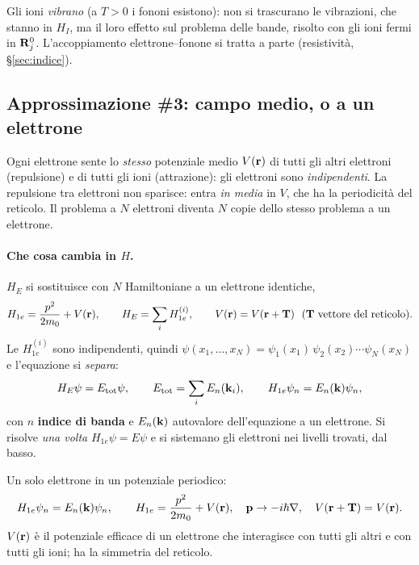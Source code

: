 \documentclass[11pt,a4paper]{article}
\begin{document}
\begin{osservazione}
Gli ioni \emph{vibrano} (a $T>0$ i fononi esistono): non si trascurano le vibrazioni, che stanno in $H_I$, ma il loro effetto sul problema delle bande,
risolto con gli ioni fermi in $\mathbf R_j^0$. L'accoppiamento elettrone--fonone si tratta a parte (resistività, §\ref{sec:indice}).
\end{osservazione}

\subsection{Approssimazione \#3: campo medio, o a un elettrone}\label{sec:approx3}
\begin{approssimazione}
Ogni elettrone sente lo \emph{stesso} potenziale medio $V(\mathbf r)$ di tutti gli altri elettroni (repulsione) e di tutti gli ioni (attrazione): gli
elettroni sono \emph{indipendenti}.
\tcblower
La repulsione tra elettroni non sparisce: entra \emph{in media} in $V$, che ha la periodicità del reticolo. Il problema a $N$ elettroni diventa $N$
copie dello stesso problema a un elettrone.
\end{approssimazione}

\paragraph{Che cosa cambia in $H$.} $H_E$ si sostituisce con $N$ Hamiltoniane a un elettrone identiche,
\[
H_{1e}=\frac{p^2}{2m_0}+V(\mathbf r),\qquad H_E=\sum_iH_{1e}^{(i)},\qquad V(\mathbf r)=V(\mathbf r+\mathbf T)\ \ (\mathbf T\text{ vettore del reticolo}).
\]
Le $H_{1e}^{(i)}$ sono indipendenti, quindi $\psi(x_1,\dots,x_N)=\psi_1(x_1)\,\psi_2(x_2)\cdots\psi_N(x_N)$ e l'equazione si \emph{separa}:
\[
H_E\psi=E_{\mathrm{tot}}\psi,\qquad E_{\mathrm{tot}}=\sum_iE_n(\mathbf k_i),\qquad H_{1e}\psi_n=E_n(\mathbf k)\psi_n,
\]
con $n$ \textbf{indice di banda} e $E_n(\mathbf k)$ autovalore dell'equazione a un elettrone. Si risolve \emph{una volta} $H_{1e}\psi=E\psi$ e si sistemano gli
elettroni nei livelli trovati, dal basso.

\begin{chiave}
Un solo elettrone in un potenziale periodico:
\[
H_{1e}\psi_n=E_n(\mathbf k)\psi_n,\qquad H_{1e}=\frac{p^2}{2m_0}+V(\mathbf r),\quad
\mathbf p\to-i\hbar\nabla,\quad V(\mathbf r+\mathbf T)=V(\mathbf r).
\]
$V(\mathbf r)$ è il potenziale efficace di un elettrone che interagisce con tutti gli altri e con tutti gli ioni; ha la simmetria del reticolo.
\end{chiave}
\end{document}
